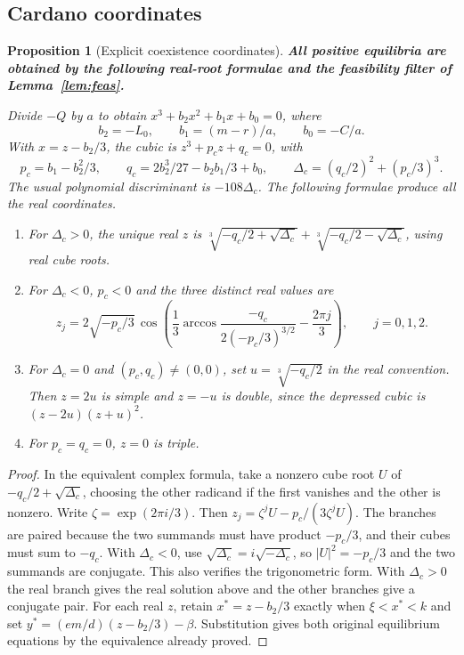 \documentclass[12pt,a4paper,twoside,fleqn]{article}
\theoremstyle{journal}
\newtheorem{proposition}{Proposition}
\newcommand{\claim}[1]{{\normalfont\bfseries\boldmath #1}}
\begin{document}
\subsection{Cardano coordinates}
\begin{proposition}[Explicit coexistence coordinates]\label{prop:cardano}
\claim{All positive equilibria are obtained by the following real-root formulae and the feasibility filter of Lemma~\ref{lem:feas}.}

Divide \(-Q\) by \(a\) to obtain \(x^3+b_2 x^2+b_1x+b_0=0\), where
\[
 b_2=-L_0,\qquad b_1=(m-r)/a,\qquad b_0=-C/a.
\]
With \(x=z-b_2/3\), the cubic is \(z^3+p_c z+q_c=0\), with
\[
 p_c=b_1-b_2^2/3,\qquad
 q_c=2b_2^3/27-b_2b_1/3+b_0,\qquad
 \Delta_c=(q_c/2)^2+(p_c/3)^3.
\]
The usual polynomial discriminant is \(-108\Delta_c\). The following formulae produce all the real coordinates.
\begin{enumerate}
\item For \(\Delta_c>0\), the unique real \(z\) is
\(\sqrt[3]{-q_c/2+\sqrt{\Delta_c}}+\sqrt[3]{-q_c/2-\sqrt{\Delta_c}}\),
using real cube roots.
\item For \(\Delta_c<0\), \(p_c<0\) and the three distinct real values are
\[
 z_j=2\sqrt{-p_c/3}\,\cos\left(\frac13\arccos
   \frac{-q_c}{2(-p_c/3)^{3/2}}-\frac{2\pi j}{3}\right),
 \qquad j=0,1,2.
\]
\item For \(\Delta_c=0\) and \((p_c,q_c)\ne(0,0)\), set
\(u=\sqrt[3]{-q_c/2}\) in the real convention. Then \(z=2u\) is simple and \(z=-u\) is double, since the depressed cubic is \((z-2u)(z+u)^2\).
\item For \(p_c=q_c=0\), \(z=0\) is triple.
\end{enumerate}
\end{proposition}
\begin{proof}
In the equivalent complex formula, take a nonzero cube root \(U\) of \(-q_c/2+\sqrt{\Delta_c}\), choosing the other radicand if the first vanishes and the other is nonzero. Write \(\zeta=\exp(2\pi i/3)\). Then \(z_j=\zeta^j U-p_c/(3\zeta^jU)\). The branches are paired because the two summands must have product \(-p_c/3\), and their cubes must sum to \(-q_c\). With \(\Delta_c<0\), use \(\sqrt{\Delta_c}=i\sqrt{-\Delta_c}\), so \(|U|^2=-p_c/3\) and the two summands are conjugate. This also verifies the trigonometric form. With \(\Delta_c>0\) the real branch gives the real solution above and the other branches give a conjugate pair. For each real \(z\), retain \(x^*=z-b_2/3\) exactly when \(\xi<x^*<k\) and set \(y^*=(em/d)(z-b_2/3)-\beta\). Substitution gives both original equilibrium equations by the equivalence already proved.

\end{proof}
\end{document}
